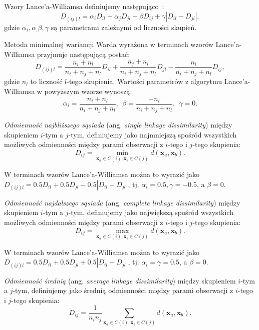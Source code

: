 \documentclass{praca1}
\begin{document}
\begin{definition}
Wzory Lance'a-Williamsa definiujemy następująco~\cite{Lance1967:hierarchical}:
$$
D_{(ij)l} = \alpha_i D_{il} + \alpha_j D_{jl} + \beta D_{ij} + \gamma |D_{il} - D_{jl}|,
$$
gdzie $\alpha_i, \alpha_, \beta, \gamma$ są parametrami zależnymi od liczności skupień.
\end{definition}

Metoda minimalnej wariancji Warda wyrażona w terminach wzorów Lance'a-Williamsa przyjmuje następującą postać:
$$
D_{(ij)l} = \frac{n_i+n_l}{n_i+n_j+n_l} D_{il} + \frac{n_j+n_l}{n_i+n_j+n_l} D_{jl} - \frac{n_l}{n_i+n_j+n_l} D_{ij},
$$
gdzie $n_l$ to liczność $l$-tego skupienia. Wartości parametrów z algorytmu Lance'a-Williamsa w powyższym wzorze wynoszą:
$$
\alpha_i =  \frac{n_i+n_l}{n_i+n_j+n_l},\ \ \beta = \frac{-n_l}{n_i+n_j+n_l},\ \ \gamma = 0.
$$

\begin{definition}
\emph{Odmienność najbliższego sąsiada} (ang. \emph{single linkage dissimilarity}) między skupieniem $i$-tym a $j$-tym, definiujemy jako najmniejszą spośród wszystkich możliwych odmienności między parami obserwacji z $i$-tego i $j$-tego skupienia:
$$
D_{ij} = \min\limits_{\mathbf{x}_a \in C(i), \mathbf{x}_b \in C(j)}d(\mathbf{x}_a, \mathbf{x}_b).
$$
\end{definition}

W terminach wzorów Lance'a-Williamsa można to wyrazić jako $D_{(ij)l} = 0.5 D_{il} + 0.5 D_{jl} - 0.5 |D_{il} - D_{jl}| $, tj. $\alpha_i = 0.5, \gamma = -0.5$, a $\beta = 0$.

\begin{definition}
\emph{Odmienność najdalszego sąsiada} (ang. \emph{complete linkage dissimilarity}) między skupieniem $i$-tym a $j$-tym, definiujemy jako największą spośród wszystkich możliwych odmienności między parami obserwacji z $i$-tego i $j$-tego skupienia:
$$
D_{ij} = \max\limits_{\mathbf{x}_a \in C(i), \mathbf{x}_b \in C(j)}d(\mathbf{x}_a, \mathbf{x}_b).
$$
\end{definition}

W terminach wzorów Lance'a-Williamsa można to wyrazić jako $D_{(ij)l} = 0.5 D_{il} + 0.5 D_{jl} + 0.5 |D_{il} - D_{jl}| $, tj. $\alpha_i = \gamma = 0.5$, a $\beta = 0$.

\begin{definition}
\emph{Odmienność średnią} (ang. \emph{average linkage dissimilarity}) między skupieniem $i$-tym a $j$-tym, definiujemy jako średnią odmienności między parami obserwacji z $i$-tego i $j$-tego skupienia:
$$
D_{ij} = \frac{1}{n_i n_j}\sum\limits_{\mathbf{x}_a \in C(i), \mathbf{x}_b \in C(j)}d(\mathbf{x}_a, \mathbf{x}_b).
$$
\end{definition}
\end{document}

